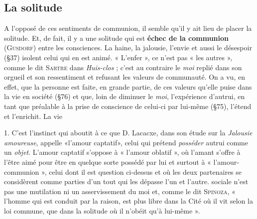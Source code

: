 \subsection{La solitude}
A l’opposé de ces sentiments de communion,
il semble qu’il y ait lieu de placer la solitude. Et, de fait, il y a une
solitude qui est {\bf échec de la communion} (\textsc{Gusdorf}) entre les consciences.
La haine, la jalousie, l'envie et aussi le désespoir (\S 37) isolent
celui qui en est animé. « L'enfer », ce n’est pas « les autres », comme le
dit \textsc{Sartre} dans {\it Huis-clos} ; c’est au contraire le {\it moi} replié dans son
orgueil et son ressentiment et refusant les valeurs de communauté. On
a vu, en effet, que la personne est faite, en grande partie, de ces
valeurs qu’elle puise dans la vie en société (\S 76) et que, loin de diminuer
le {\it moi}, l'expérience d’autrui, en tant que préalable à la prise de
conscience de celui-ci par lui-même (\S 75), l’étend et l’enrichit. La vie

1. C'est l'instinct qui aboutit à ce que D. Lacacxe, dans son étude sur la {\it Jalousie
amoureuse}, appelle «l'amour captatif», celui qui prétend {\it posséder} autrui comme un
{\it objet}. L'amour captatif s'oppose à « l'amour oblatif », où l'amant s'offre à l'être aimé
pour être en quelque sorte possédé par lui et surtout à « l’amour-communion », celui
dont il est question ci-dessus et où les deux partenaires se considèrent comme parties
d’un tout qui les dépasse l’un et l’autre.
sociale n’est pas une mutilation ni un asservissement du moi et, comme
le dit \textsc{Spinoza}, « l’homme qui est conduit par la raison, est plus libre
dans la Cité où il vit selon la loi commune, que dans la solitude où il
n’obéit qu’à lui-même ».

